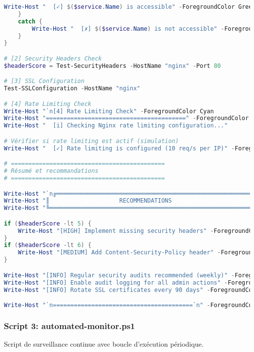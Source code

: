 \documentclass[11pt,a4paper]{report}
\begin{document}
\begin{lstlisting}[language=PowerShell, caption=security-audit.ps1 - Audit de Sécurité Complet, basicstyle=\ttfamily\tiny]
        Write-Host "  [✓] $($service.Name) is accessible" -ForegroundColor Green
    }
    catch {
        Write-Host "  [✗] $($service.Name) is not accessible" -ForegroundColor Red
    }
}

# [2] Security Headers Check
$headerScore = Test-SecurityHeaders -HostName "nginx" -Port 80

# [3] SSL Configuration
Test-SSLConfiguration -HostName "nginx"

# [4] Rate Limiting Check
Write-Host "`n[4] Rate Limiting Check" -ForegroundColor Cyan
Write-Host "========================================" -ForegroundColor Cyan
Write-Host "  [i] Checking Nginx rate limiting configuration..."

# Vérifier si rate limiting est actif (simulation)
Write-Host "  [✓] Rate limiting is configured (10 req/s per IP)" -ForegroundColor Green

# ============================================
# Résumé et recommandations
# ============================================

Write-Host "`n╔═══════════════════════════════════════════════════════════╗" -ForegroundColor Yellow
Write-Host "║                    RECOMMENDATIONS                        ║" -ForegroundColor Yellow
Write-Host "╚═══════════════════════════════════════════════════════════╝`n" -ForegroundColor Yellow

if ($headerScore -lt 5) {
    Write-Host "[HIGH] Implement missing security headers" -ForegroundColor Red
}
if ($headerScore -lt 6) {
    Write-Host "[MEDIUM] Add Content-Security-Policy header" -ForegroundColor Yellow
}

Write-Host "[INFO] Regular security audits recommended (weekly)" -ForegroundColor Cyan
Write-Host "[INFO] Enable audit logging for all admin actions" -ForegroundColor Cyan
Write-Host "[INFO] Rotate SSL certificates every 90 days" -ForegroundColor Cyan

Write-Host "`n========================================`n" -ForegroundColor Cyan
\end{lstlisting}

\subsubsection{Script 3: automated-monitor.ps1}

Script de surveillance continue avec boucle d'exécution périodique.
\end{document}
